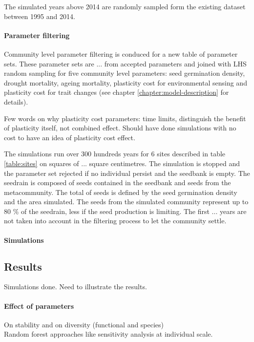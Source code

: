 The simulated years above 2014 are randomly sampled form the existing dataset between 1995 and 2014.

\paragraph{Parameter filtering}
Community level parameter filtering is conduced for a new table of parameter sets. These parameter sets are ... from accepted parameters and joined with LHS random sampling for five community level parameters: seed germination density, drought mortality, ageing mortality, plasticity cost for environmental sensing and plasticity cost for trait changes (see chapter \ref{chapter:model-description} for details).

Few words on why plasticity cost parameters: time limits, distinguish the benefit of plasticity itself, not combined effect. Should have done simulations with no cost to have an idea of plasticity cost effect. 

The simulations run over 300 hundreds years for 6 sites described in table \ref{table:sites} on squares of ... square centimetres. The simulation is stopped and the parameter set rejected if no individual persist and the seedbank is empty. The seedrain is composed of seeds contained in the seedbank and seeds from the metacommunity. The total of seeds is defined by the seed germination density and the area simulated. The seeds from the simulated community represent up to 80 \% of the seedrain, less if the seed production is limiting. The first ... years are not taken into account in the filtering process to let the community settle.


\paragraph{Simulations}

\subsection{Results}

Simulations done. Need to illustrate the results.\\

\paragraph{Effect of parameters}
On stability and on diversity (functional and species)\\
Random forest approaches like sensitivity analysis at individual scale.


